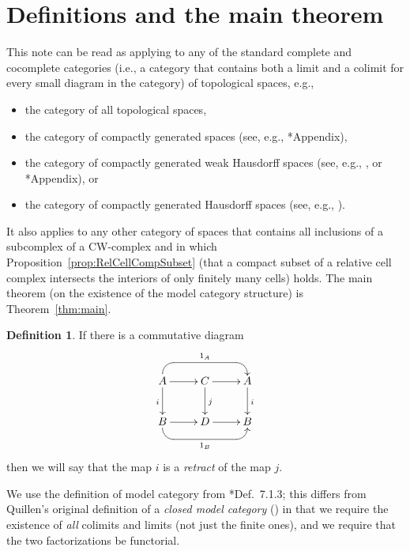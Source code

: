 \documentclass[12pt]{amsart}
\numberwithin{equation}{section}
\theoremstyle{slplain}
\theoremstyle{definition}
\newtheorem{defn}[equation]{Definition} %
\theoremstyle{remark}
\newcommand{\thmref}{Theorem~\ref}
\newcommand{\propref}{Proposition~\ref}
\begin{document}
\section{Definitions and the main theorem}
\label{sec:MCdef}

This note can be read as applying to any of the standard complete and
cocomplete categories (i.e., a category that contains both a limit and
a colimit for every small diagram in the category) of topological
spaces, e.g.,
\begin{itemize}
\item the category of all topological spaces,
\item the category of compactly generated spaces (see, e.g.,
  \cite{Boardman-Vogt}*{Appendix}),
\item the category of compactly generated weak Hausdorff spaces (see,
  e.g., \cite{Strickland}, or \cite{Fritsch-Piccinini}*{Appendix}), or
\item the category of compactly generated Hausdorff spaces (see, e.g.,
  \cite{Steenrod}).
\end{itemize}
It also applies to any other category of spaces that contains all
inclusions of a subcomplex of a CW-complex and in which
\propref{prop:RelCellCompSubset} (that a compact subset of a relative
cell complex intersects the interiors of only finitely many cells)
holds.  The main theorem (on the existence of the model category
structure) is \thmref{thm:main}.

\begin{defn}
  \label{def:retract}
  If there is a commutative diagram
  \begin{displaymath}
    \xymatrix{
      {A} \ar[r] \ar[d]_{i} 
           \ar `u[rr] `[drr]^{1_{A}} [rr]+<0pt,6pt>
        & {C} \ar[r] \ar[d]^{j}
        & {A} \ar[d]^{i}\\
      {B} \ar[r]
           \ar `d[rr] `[urr]_{1_{B}} [rr]
        & {D} \ar[r]
        & {B}
    }
  \end{displaymath}
  then we will say that the map $i$ is a \emph{retract} of the map
  $j$.
\end{defn}

We use the definition of model category from
\cite{MCATL}*{Def.~7.1.3}; this differs from Quillen's original
definition of a \emph{closed model category} (\cites{Q:HomAlg,Q:RHT})
in that we require the existence of \emph{all} colimits and limits
(not just the finite ones), and we require that the two factorizations
be functorial.
\end{document}
